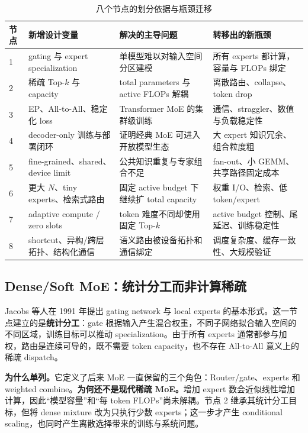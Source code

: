 \documentclass[10pt,a4paper,fontset=none]{ctexart}
\newcommand{\term}[1]{\textbf{#1}}
\begin{document}
\begin{table}[htbp]
\centering
\caption{八个节点的划分依据与瓶颈迁移}
\label{zh:tab:evolution-nodes}
\small
\begin{tabularx}{\textwidth}{p{}p{}p{}Y}
\toprule
节点 & 新增设计变量 & 解决的主导问题 & 转移出的新瓶颈 \\
 & gating 与 expert specialization & 单模型难以对输入空间分区建模 & 所有 experts 都计算，容量与 FLOPs 绑定 \\
2 & 稀疏 Top-$k$ 与 capacity & total parameters 与 active FLOPs 解耦 & 离散路由、collapse、token drop \\
3 & EP、All-to-All、稳定化 loss & Transformer MoE 的集群级训练 & 通信、straggler、数值与负载稳定性 \\
4 & decoder-only 训练与部署闭环 & 证明经典 MoE 可进入开放模型生态 & 大 expert 知识冗余、组合粒度粗 \\
5 & fine-grained、shared、device limit & 公共知识重复与专家组合不足 & fan-out、小 GEMM、共享路径固定成本 \\
6 & 更大 $N$、tiny experts、检索式路由 & 固定 active budget 下继续扩 total capacity & 权重 I/O、检索、低 token/expert \\
7 & adaptive compute / zero slots & token 难度不同却使用固定 Top-$k$ & active budget 控制、尾延迟、训练稳定性 \\
8 & shortcut、异构/跨层拓扑、结构化通信 & 语义路由被设备拓扑和通信绑定 & 调度复杂度、缓存一致性、大规模验证 \\
\bottomrule
\end{tabularx}
\end{table}

\subsection{Dense/Soft MoE：统计分工而非计算稀疏}

Jacobs 等人在 1991 年提出 gating network 与 local experts 的基本形式\cite{zh:jacobs1991adaptive}。这一节点建立的是\term{统计分工}：gate 根据输入产生混合权重，不同子网络拟合输入空间的不同区域，训练目标可以推动 specialization。由于所有 experts 通常都参与加权，路由是连续可导的，既不需要 token capacity，也不存在 All-to-All 意义上的稀疏 dispatch。

\textbf{为什么单列。}它定义了后来 MoE 一直保留的三个角色：Router/gate、experts 和 weighted combine。\textbf{为何还不是现代稀疏 MoE。}增加 expert 数会近似线性增加计算，因此“模型容量”和“每 token FLOPs”尚未解耦。节点 2 继承其统计分工目标，但将 dense mixture 改为只执行少数 experts；这一步才产生 conditional scaling，也同时产生离散选择带来的训练与系统问题。
\end{document}
